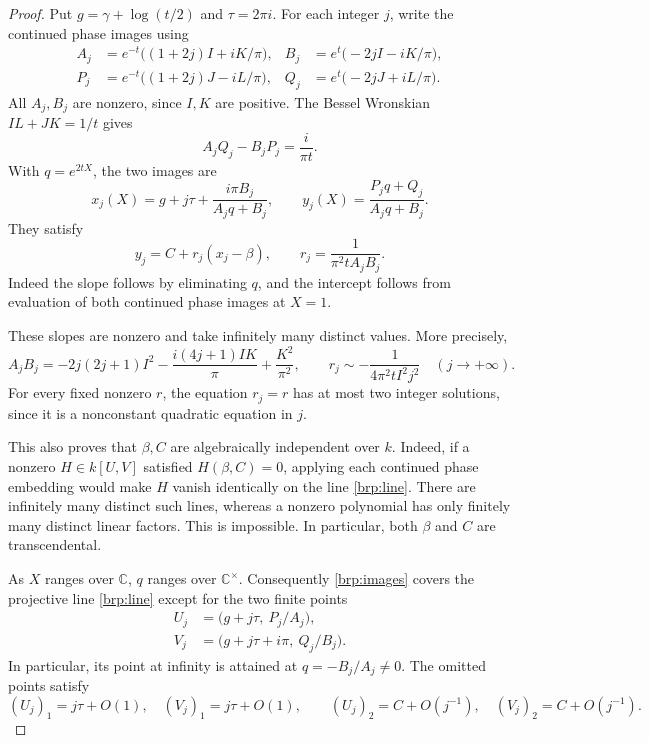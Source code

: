 \documentclass[11pt]{article}
\theoremstyle{definition}
\theoremstyle{remark}
\begin{document}
\begin{proof}
Put $g=\gamma+\log(t/2)$ and $\tau=2\pi i$.  For each integer $j$,
write the continued phase images using
\begin{align*}
 A_j&=e^{-t}\bigl((1+2j)I+iK/\pi\bigr),&
 B_j&=e^t\bigl(-2jI-iK/\pi\bigr),\\
 P_j&=e^{-t}\bigl((1+2j)J-iL/\pi\bigr),&
 Q_j&=e^t\bigl(-2jJ+iL/\pi\bigr).
\end{align*}
All $A_j,B_j$ are nonzero, since $I,K$ are positive.  The Bessel
Wronskian $IL+JK=1/t$ gives
\[
 A_jQ_j-B_jP_j=\frac{i}{\pi t}.
\]
With $q=e^{2tX}$, the two images are
\begin{equation}\label{brp:images}
 x_j(X)=g+j\tau+\frac{i\pi B_j}{A_jq+B_j},\qquad
 y_j(X)=\frac{P_jq+Q_j}{A_jq+B_j}.
\end{equation}
They satisfy
\begin{equation}\label{brp:line}
 y_j=C+r_j(x_j-\beta),\qquad
 r_j=\frac{1}{\pi^2tA_jB_j}.
\end{equation}
Indeed the slope follows by eliminating $q$, and the intercept follows
from evaluation of both continued phase images at $X=1$.

These slopes are nonzero and take infinitely many distinct values.
More precisely,
\[
 A_jB_j=-2j(2j+1)I^2-\frac{i(4j+1)IK}{\pi}
              +\frac{K^2}{\pi^2},\qquad
 r_j\sim-\frac{1}{4\pi^2tI^2j^2}
 \quad(j\longrightarrow+\infty).
\]
For every fixed nonzero $r$, the equation $r_j=r$ has at most two
integer solutions, since it is a nonconstant quadratic equation in $j$.

This also proves that $\beta,C$ are algebraically independent over
$k$.  Indeed, if a nonzero $H\in k[U,V]$ satisfied $H(\beta,C)=0$,
applying each continued phase embedding would make $H$ vanish
identically on the line \eqref{brp:line}.  There are infinitely many
distinct such lines, whereas a nonzero polynomial has only finitely
many distinct linear factors.  This is impossible.  In particular,
both $\beta$ and $C$ are transcendental.

As $X$ ranges over $\mathbb C$, $q$ ranges over $\mathbb C^\times$.
Consequently \eqref{brp:images} covers the projective line
\eqref{brp:line} except for the two finite points
\begin{align*}
 U_j&=\bigl(g+j\tau,\ P_j/A_j\bigr),\\
 V_j&=\bigl(g+j\tau+i\pi,\ Q_j/B_j\bigr).
\end{align*}
In particular, its point at infinity is attained at
$q=-B_j/A_j\ne0$.  The omitted points satisfy
\begin{equation}\label{brp:endpoint-asymptotics}
 (U_j)_1=j\tau+O(1),\quad (V_j)_1=j\tau+O(1),\qquad
 (U_j)_2=C+O(j^{-1}),\quad (V_j)_2=C+O(j^{-1}).
\end{equation}


\end{proof}
\end{document}
